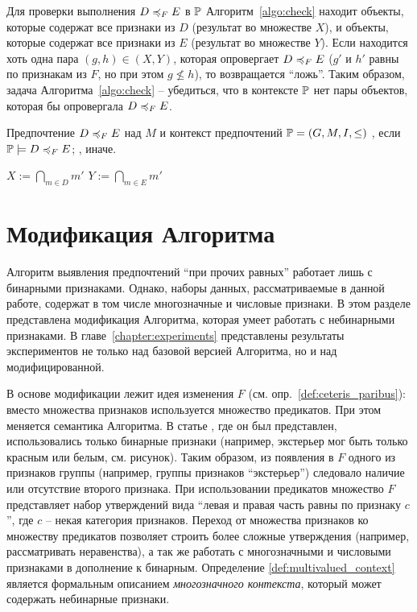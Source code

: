 		Для проверки выполнения $D \preccurlyeq_{F} E$ в $\mathbb{P}$ Алгоритм~\ref{algo:check} находит объекты, которые содержат все признаки из $D$ (результат во множестве $X$), и объекты, которые содержат все признаки из $E$ (результат во множестве $Y$). Если находится хоть одна пара $(g,h) \in (X, Y)$, которая опровергает $D \preccurlyeq_{F} E$ ($g'$ и $h'$ равны по признакам из $F$, но при этом $g \nleq h$), то возвращается ``ложь''. Таким образом, задача Алгоритма~\ref{algo:check} – убедиться, что в контексте $\mathbb{P}$ нет пары объектов, которая бы опровергала $D \preccurlyeq_{F} E$. 
	
	
		\begin{algorithm}
			\caption{$(\DEF, \PP)$ \cite[Алг.~2]{Obiedkov:2013}}
			\label{algo:check}
			\begin{algorithmic}[1]
				\REQUIRE Предпочтение $D \preccurlyeq_{F} E$ над $M$ и контекст предпочтений $\mathbb{P} = (G, M, I, \leq)$
				\ENSURE \TRUE, если $\mathbb{P} \models D \preccurlyeq_{F} E$; \FALSE, иначе.
				\item[]
				\STATE $X := \bigcap_{m \in D}m'$
				\STATE $Y := \bigcap_{m \in E}m'$
				\RETURN \FALSE
				\ENDIF
				\ENDFOR
				\ENDFOR
				\RETURN \TRUE
			\end{algorithmic}
		\end{algorithm}
		


\section{Модификация Алгоритма}	
\label{sec:modification}	
		
	Алгоритм выявления предпочтений \enquote{при прочих равных} работает лишь с бинарными признаками. Однако, наборы данных, рассматриваемые в данной работе, содержат в том числе многозначные и числовые признаки. В этом разделе представлена модификация Алгоритма, которая умеет работать с небинарными признаками. В главе~\ref{chapter:experiments} представлены результаты экспериментов не только над базовой версией Алгоритма, но и над модифицированной.
	
	В основе модификации лежит идея изменения $F$ (см. опр.~\ref{def:ceteris_paribus}): вместо множества признаков используется множество предикатов. При этом меняется семантика Алгоритма. В статье \cite{Obiedkov:2013}, где он был представлен, использовались только бинарные признаки (например, экстерьер мог быть только красным или белым, см. рисунок). Таким образом, из появления в $F$ одного из признаков группы (например, группы признаков ``экстерьер'') следовало наличие или отсутствие второго признака. При использовании предикатов множество $F$ представляет набор утверждений вида ``левая и правая часть равны по признаку $c$'', где $c$ – некая категория признаков. Переход от множества признаков ко множеству предикатов позволяет строить более сложные утверждения (например, рассматривать неравенства), а так же работать с многозначными и числовыми признаками в дополнение к бинарным. Определение \ref{def:multivalued_context}\cite{Ganter:1997} является формальным описанием \emph{многозначного контекста}, который может содержать небинарные признаки.
	
